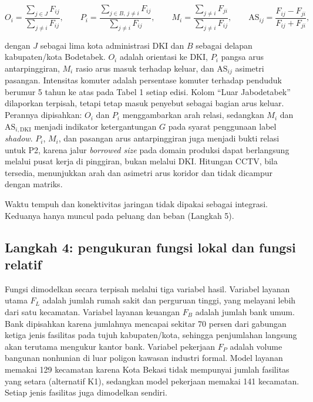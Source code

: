 \documentclass[12pt,a4paper,oneside,openany,indonesian]{report}
\begin{document}
\[
O_i = \frac{\sum_{j \in J} F_{ij}}{\sum_{j \neq i} F_{ij}}, \qquad
P_i = \frac{\sum_{j \in B,\, j \neq i} F_{ij}}{\sum_{j \neq i} F_{ij}}, \qquad
M_i = \frac{\sum_{j \neq i} F_{ji}}{\sum_{j \neq i} F_{ij}}, \qquad
\mathrm{AS}_{ij} = \frac{F_{ij}-F_{ji}}{F_{ij}+F_{ji}},
\]

\noindent dengan $J$ sebagai lima kota administrasi DKI dan $B$ sebagai
delapan kabupaten/kota Bodetabek. $O_i$ adalah orientasi ke DKI, $P_i$
pangsa arus antarpinggiran, $M_i$ rasio arus masuk terhadap keluar, dan
$\mathrm{AS}_{ij}$ asimetri pasangan. Intensitas komuter adalah
persentase komuter terhadap penduduk berumur 5 tahun ke atas pada
Tabel 1 setiap edisi. Kolom ``Luar Jabodetabek'' dilaporkan terpisah, tetapi
tetap masuk penyebut sebagai bagian arus keluar. Perannya dipisahkan: $O_i$ dan
$P_i$ menggambarkan arah relasi, sedangkan $M_i$ dan
$\mathrm{AS}_{i,\mathrm{DKI}}$ menjadi indikator ketergantungan $G$ pada
syarat penggunaan label \emph{shadow}. $P_i$, $M_i$, dan pasangan arus antarpinggiran
juga menjadi bukti relasi untuk P2, karena jalur \emph{borrowed size}
pada domain produksi dapat berlangsung melalui pusat kerja di pinggiran,
bukan melalui DKI.
Hitungan CCTV, bila tersedia, menunjukkan arah dan asimetri arus koridor
dan tidak dicampur dengan matriks.

Waktu tempuh dan konektivitas jaringan tidak dipakai sebagai integrasi.
Keduanya hanya muncul pada peluang dan beban (Langkah 5).

\subsection{Langkah 4: pengukuran fungsi lokal dan fungsi
relatif}\label{langkah-4-pengukuran-fungsi-lokal-dan-fungsi-relatif}

Fungsi dimodelkan secara terpisah melalui tiga variabel hasil. Variabel
layanan utama $F_{L}$
adalah jumlah rumah sakit dan perguruan tinggi, yang melayani lebih
dari satu kecamatan. Variabel layanan keuangan $F_{B}$ adalah jumlah bank
umum. Bank dipisahkan karena jumlahnya mencapai sekitar 70 persen dari
gabungan ketiga jenis fasilitas pada tujuh kabupaten/kota, sehingga
penjumlahan langsung akan terutama mengukur kantor bank. Variabel pekerjaan
$F_{P}$ adalah volume bangunan nonhunian di luar poligon kawasan
industri formal. Model layanan memakai 129 kecamatan karena Kota Bekasi
tidak mempunyai jumlah fasilitas yang setara (alternatif K1), sedangkan
model pekerjaan memakai 141 kecamatan. Setiap jenis fasilitas juga
dimodelkan sendiri.
\end{document}
